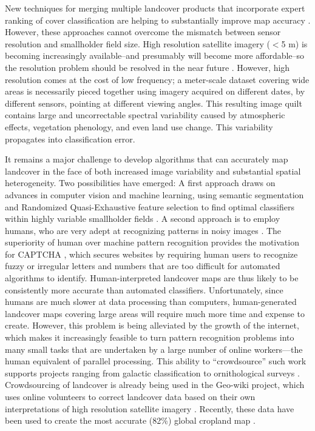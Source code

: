 \documentclass[preprint,12pt,authoryear]{elsarticle}
\begin{document}
New techniques for merging multiple landcover products that incorporate expert ranking of cover classification are helping to substantially improve map accuracy \citep{fritz_cropland_2011,fritz_mapping_2015}. However, these approaches cannot overcome the mismatch between sensor resolution and smallholder field size. High resolution satellite imagery ($<$5 m) is becoming increasingly available--and presumably will become more affordable--so the resolution problem should be resolved in the near future \citep{see_improved_2015, lobell_use_2013}. However, high resolution comes at the cost of low frequency; a meter-scale dataset covering wide areas is necessarily pieced together using imagery acquired on different dates, by different sensors, pointing at different viewing angles. This resulting image quilt contains large and uncorrectable spectral variability caused by atmospheric effects, vegetation phenology, and even land use change. This variability propagates into classification error.  

It remains a major challenge to develop algorithms that can accurately map landcover in the face of both increased image variability and substantial spatial heterogeneity. Two possibilities have emerged: A first approach draws on  advances in computer vision and machine learning, using semantic segmentation \citep[e.g.][]{schroff_object_2008} and Randomized Quasi-Exhaustive feature selection \citep{tokarczyk_features_2015} to find optimal classifiers within highly variable smallholder fields \citep{debats_generalized_????}. A second approach is to employ humans, who are very adept at recognizing patterns in noisy images \citep{biederman_recognition-by-components:_1987}. The superiority of human over machine pattern recognition provides the motivation for CAPTCHA \citep{ahn_captcha:_2003}, which secures websites by requiring human users to recognize fuzzy or irregular letters and numbers that are too difficult for automated algorithms to identify. Human-interpreted landcover maps are thus likely to be consistently more accurate than automated classifiers. Unfortunately, since humans are much slower at data processing than computers, human-generated landcover maps covering large areas will require much more time and expense to create. However, this problem is being alleviated by the growth of the internet, which makes it increasingly feasible to turn pattern recognition problems into many small tasks that are undertaken by a large number of online workers---the human equivalent of parallel processing. This ability to ``crowdsource'' \citep{howe_rise_2006} such work supports projects ranging from galactic classification \citep{lintott_galaxy_2008} to ornithological surveys \citep{sullivan_ebird:_2009}. Crowdsourcing of landcover is already being used in the Geo-wiki project, which uses online volunteers to correct landcover data based on their own interpretations of high resolution satellite imagery \citep{fritz_geo-wiki.org:_2009, fritz_geo-wiki:_2012, fritz_mapping_2015}. Recently, these data have been used to create the most accurate (82\%) global cropland map \citep{fritz_cropland_2011, fritz_mapping_2015}.  
\end{document}

